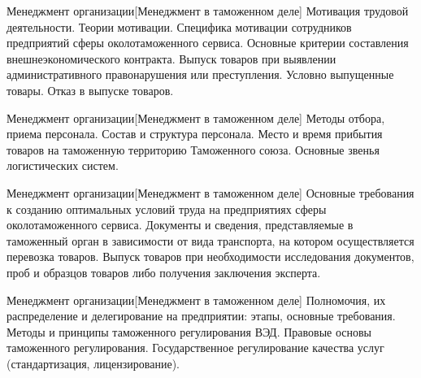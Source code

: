 \documentclass[
	11pt,
	a4paper,
	]
	{article}
\begin{document}
\vfill



\begin{minipage}[t][\miniH]{\miniL}\centering
	 {Менеджмент организации}[Менеджмент в таможенном деле]
		{
			Мотивация трудовой деятельности. Теории мотивации. Специфика мотивации сотрудников предприятий сферы околотаможенного сервиса.
		}{
			Основные критерии составления внешнеэкономического контракта.
		}{
			Выпуск товаров при выявлении административного правонарушения или преступления. Условно выпущенные товары. Отказ в выпуске товаров.
		}
	\lowGE
\end{minipage}





\begin{minipage}[t][\miniH]{\miniL}\centering
	 {Менеджмент организации}[Менеджмент в таможенном деле]
		{
			Методы отбора, приема персонала. Состав и структура персонала.
		}{
			Место и время прибытия товаров на таможенную территорию Таможенного союза.
		}{
			Основные звенья логистических систем.
		}
	\lowGE
\end{minipage}

\vfill



\begin{minipage}[t][\miniH]{\miniL}\centering
	 {Менеджмент организации}[Менеджмент в таможенном деле]
		{
			Основные требования к созданию оптимальных условий труда на предприятиях сферы околотаможенного сервиса.
		}{
			Документы и сведения, представляемые в таможенный орган в зависимости от вида транспорта, на котором осуществляется перевозка товаров.
		}{
			Выпуск товаров при необходимости исследования документов, проб и образцов товаров либо получения заключения эксперта.
		}
	\lowGE
\end{minipage}

\vfill



\begin{minipage}[t][\miniH]{\miniL}\centering
	 {Менеджмент организации}[Менеджмент в таможенном деле]
		{
			Полномочия, их распределение и делегирование на предприятии: этапы, основные требования.
		}{
			Методы и принципы таможенного регулирования ВЭД. Правовые основы таможенного регулирования.
		}{
			Государственное регулирование качества услуг (стандартизация, лицензирование).
		}
	\lowGE
\end{minipage}
\end{document}

